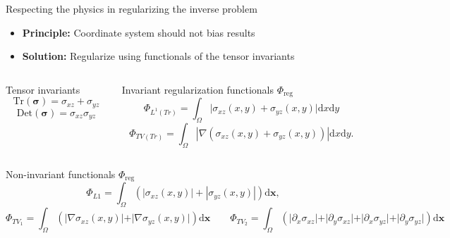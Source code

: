 \documentclass[presentation,aspectratio=169]{beamer}
\newcommand{\dd}{\mathrm{d}}
\newcommand{\bx}{\mathbf{x}}
\begin{document}
 
\begin{frame}{Respecting the physics in regularizing the inverse problem}
\small
\begin{itemize}
\item \textbf{Principle:} Coordinate system should not bias results
\item \textbf{Solution:}  Regularize using functionals of the tensor invariants
\end{itemize}
\begin{columns}
\begin{column}{0.35\textwidth}
\begin{exampleblock}{Tensor invariants}
\[
\textrm{Tr}(\boldsymbol\sigma) = \sigma_{xz} + \sigma_{yz}
\]
\[
\textrm{Det}(\boldsymbol\sigma) = \sigma_{xz}\sigma_{yz}
\]
\end{exampleblock}
\end{column}
\begin{column}{0.6\textwidth}
\begin{exampleblock}{Invariant regularization functionals $\Phi_{\textrm{reg}}$}
\[
\Phi_{L^1(Tr)} = \int_\Omega \vert \sigma_{xz}(x,y) + \sigma_{yz}(x,y)  \vert \dd x\dd y
\]
\[
\Phi_{TV(Tr)} =  \int_\Omega | \nabla(\sigma_{xz}(x,y) + \sigma_{yz}(x,y) ) | \dd x\dd y.
\]

\end{exampleblock}
\end{column}
\end{columns}
\begin{block}{Non-invariant functionals $\Phi_{\textrm{reg}}$} \small
\[
\Phi_{L1} = \int_\Omega\left( \left| \sigma_{xz}(x,y) \right|+\left|\sigma_{yz}(x,y) \right|\right)\dd\bx,
\]
\[
 \Phi_{TV_1} = \int_\Omega \left( \vert\nabla\sigma_{xz}(x,y) \vert + \vert\nabla\sigma_{yz}(x,y) \vert\right)\dd\bx
\qquad
\Phi_{TV_2} = \int_\Omega  \left( \vert\partial_x\sigma_{xz}\vert + \vert\partial_y\sigma_{xz}\vert + \vert\partial_x\sigma_{yz}\vert+ \vert\partial_y\sigma_{yz}\vert\right)\dd\bx
\]

\end{block}

\end{frame}
\end{document}
